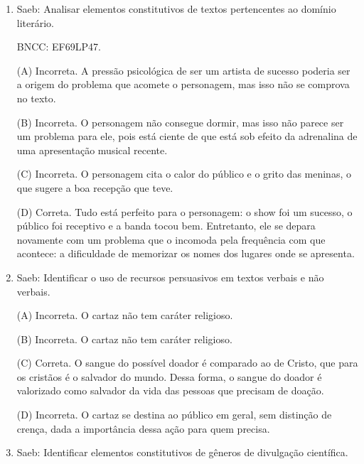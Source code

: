 \begin{enumerate}
(C) Incorreta. Pelo contrário, o articulador introduz uma ideia oposta,
e não uma concordância. Além disso, ele não expressa sentido conclusivo.

(D) Correta. No trecho anterior, o autor apresenta vantagens da
tecnologia. O articulador introduz desvantagens, isto é, apresenta
ideias opostas às anteriores e que avaliam negativamente a tecnologia.

\item

Saeb: Analisar elementos constitutivos de textos pertencentes ao domínio
literário.

BNCC: EF69LP47.

(A) Incorreta. A pressão psicológica de ser um artista de sucesso
poderia ser a origem do problema que acomete o personagem, mas isso não
se comprova no texto.

(B) Incorreta. O personagem não consegue dormir, mas isso não parece ser
um problema para ele, pois está ciente de que está sob efeito da
adrenalina de uma apresentação musical recente.

(C) Incorreta. O personagem cita o calor do público e o grito das
meninas, o que sugere a boa recepção que teve.

(D) Correta. Tudo está perfeito para o personagem: o show foi um
sucesso, o público foi receptivo e a banda tocou bem. Entretanto, ele se
depara novamente com um problema que o incomoda pela frequência com que
acontece: a dificuldade de memorizar os nomes dos lugares onde se
apresenta.

\item

Saeb: Identificar o uso de recursos persuasivos em textos verbais e não
verbais.

(A) Incorreta. O cartaz não tem caráter religioso.

(B) Incorreta. O cartaz não tem caráter religioso.

(C) Correta. O sangue do possível doador é comparado ao de Cristo, que
para os cristãos é o salvador do mundo. Dessa forma, o sangue do doador
é valorizado como salvador da vida das pessoas que precisam de doação.

(D) Incorreta. O cartaz se destina ao público em geral, sem distinção de
crença, dada a importância dessa ação para quem precisa.

\item

Saeb: Identificar elementos constitutivos de gêneros de divulgação
científica.


\end{enumerate}
